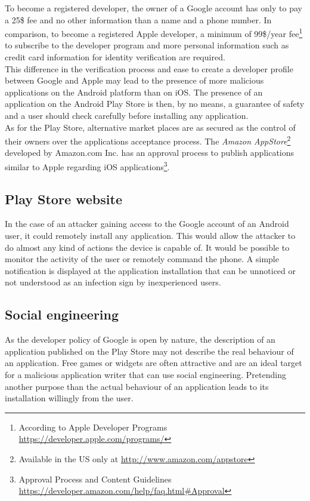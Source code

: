 To become a registered developer, the owner of a Google account has only to pay a 25\$ fee and no other information than a name and a phone number.
In comparison, to become a registered Apple developer, a minimum of 99\$/year fee\footnote{According to Apple Developer Programs \url{https://developer.apple.com/programs/}} to subscribe to the developer program and more personal information such as credit card information for identity verification are required.\\

This difference in the verification process and ease to create a developer profile between Google and Apple may lead to the presence of more malicious applications on the Android platform than on iOS.
The presence of an application on the Android Play Store is then, by no means, a guarantee of safety and a user should check carefully before installing any application.\\

As for the Play Store, alternative market places are as secured as the control of their owners over the applications acceptance process.
The \emph{Amazon AppStore}\footnote{Available in the US only at \url{http://www.amazon.com/appstore}} developed by Amazon.com Inc. has an approval process to publish applications similar to Apple regarding iOS applications\footnote{Approval Process and Content Guidelines \url{https://developer.amazon.com/help/faq.html\#Approval}}.

\subsection{Play Store website}

In the case of an attacker gaining access to the Google account of an Android user, it could remotely install any application.
This would allow the attacker to do almost any kind of actions the device is capable of.
It would be possible to monitor the activity of the user or remotely command the phone.
A simple notification is displayed at the application installation that can be unnoticed or not understood as an infection sign by inexperienced users.

\subsection{Social engineering}

As the developer policy of Google is open by nature, the description of an application published on the Play Store may not describe the real behaviour of an application.
Free games or widgets are often attractive and are an ideal target for a malicious application writer that can use social engineering.
Pretending another purpose than the actual behaviour of an application leads to its installation willingly from the user.\\

